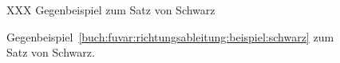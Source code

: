 %
%
%
\begin{figure}
\centering
XXX Gegenbeispiel zum Satz von Schwarz
\caption{Gegenbeispiel~\ref{buch:fuvar:richtungsableitung:beispiel:schwarz}
zum Satz von Schwarz.
\label{buch:fuvar:richtungsableitung:fig:schwarz}}
\end{figure}
